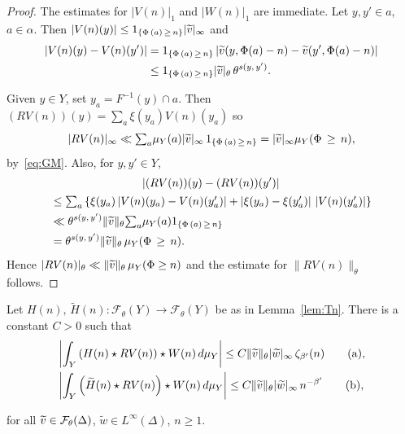 \documentclass[AHL,Unicode,longabstracts,published]{cedram}
\newcommand{\cF}{\mathcal{F}}
\newcommand{\suma}{\textstyle{\sum_a}}
\newcommand{\tw}{\widetilde{w}}
\newcommand{\tv}{\tilde{v}}
\newcommand{\tH}{\widetilde{H}}
\newcommand*{\alphenumi}{\renewcommand*{\theenumi}{\alph{enumi}}}
\let\oldtilde\tilde
\renewcommand*{\tilde}[1]{\mathchoice{\widetilde{#1}}{\widetilde{#1}}{\oldtilde{#1}}{\oldtilde{#1}}}
\begin{document}
\begin{proof}
The estimates for $|V(n)|_1$ and $|W(n)|_1$ are immediate. Let $y,y'\in a$, $a\in\alpha$. Then $|V(n)(y)|
\le 1_{\left\{\Phi\,(a)\,\ge\,n\right\}}|\tv|_\infty$ and
\begin{align*}
\left|V(n)(y)-V(n)(y')\right| & = 1_{\left\{\Phi\,(a)\,\ge\,n\right\}} \left|\tv(y,\Phi(a)-n)-\tv(y',\Phi(a)-n)\right|\\
& \le 1_{\left\{\Phi\,(a)\,\ge\,n\right\}}|\tv|_\theta\,\theta^{s(y,\,y')}.
\end{align*}

Given $y\in Y$, set $y_a=F^{-1}(y)\cap a$. Then $(RV(n))(y)=\suma \xi(y_a)V(n)(y_a)$ so
\[
|RV(n)|_\infty\ll
\suma \mu_Y(a)|\tv|_\infty\, 1_{\left\{\Phi\,(a)\,\ge\,n\right\}} =|\tv|_\infty\mu_Y(\Phi\,\ge\, n),
\]
by~\eqref{eq:GM}. Also, for $y,y'\in Y$,
\begin{multline*}
\left|(RV(n))(y)- (RV(n))(y')\right|
\\ 
\begin{aligned}
& \le\suma \left\{\xi(y_a)\left|V(n)(y_a)-V(n)(y'_a)\right| +\left|\xi(y_a)-\xi(y'_a)\right|\,\left|V(n)(y'_a)\right|\right\}\\
& \ll \theta^{s(y,\,y')}\|\tv\|_\theta \suma\mu_Y(a)1_{\left\{\Phi\,(a)\,\ge\,n\right\}}\\
&= \theta^{s(y,\,y')}\|\tv\|_\theta\, \mu_Y(\Phi\,\ge\,n).
\end{aligned}
\end{multline*}
Hence $|RV(n)|_\theta\ll \|\tv\|_\theta\, \mu_Y(\Phi\ge n)$ and the estimate for $\|RV(n)\|_\theta$ follows.
\end{proof}

\begin{coro} \label{cor:Hn}
Let $H(n),\,\tH(n):\cF_\theta(Y)\to\cF_\theta(Y)$ be as in Lemma~\ref{lem:Tn}. There is a constant $C>0$ such that
\begin{align}
&\left|\int_Y\left(H(n)\star RV(n)\right)\star W(n)\,d\mu_Y\right| \le C \|\tv\|_\theta |\tw|_\infty\, \zeta_{\beta'}(n)\tag{${\rm a}$}\label{coro4.6.1},\\
&\left|\int_Y\left(\tH(n)\star RV(n)\right)\star W(n)\,d\mu_Y\right| \le C \|\tv\|_\theta |\tw|_\infty\, n^{-\beta'}\tag{${\rm b}$}\label{coro4.6.2},
\end{align}

for all $\tv\in\cF_\theta(\Delta)$, $\tw\in L^\infty(\Delta)$, $n\ge1$.
\end{coro}
\end{document}
